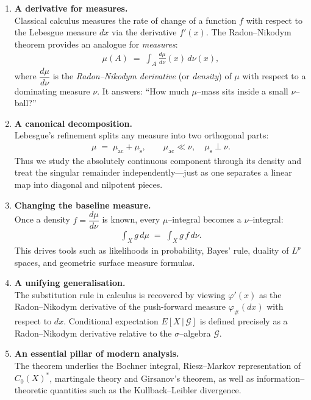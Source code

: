 \documentclass[12pt]{article}
\title{}
\author{Jerich Lee}
\date{\today}
\theoremstyle{definition} %
\theoremstyle{plain} %
\begin{document}
\maketitle
\begin{enumerate}
  \item \textbf{A derivative for measures.}\\
  Classical calculus measures the rate of change of a function $f$ with respect to the Lebesgue measure $dx$ via the derivative $f'(x)$.  
  The Radon–Nikodym theorem provides an analogue for \emph{measures}:
  \begin{align}
      \mu(A) \;=\; \int_A \frac{d\mu}{d\nu}(x)\,d\nu(x),
  \end{align}
  where $\dfrac{d\mu}{d\nu}$ is the \emph{Radon–Nikodym derivative} (or \emph{density}) of $\mu$ with respect to a dominating measure $\nu$.
  It answers: “How much $\mu$–mass sits inside a small $\nu$–ball?”

  \item \textbf{A canonical decomposition.}\\
  Lebesgue’s refinement splits any measure into two orthogonal parts:
  \begin{align}
      \mu \;=\; \mu_{\text{ac}} + \mu_{\text{s}},
      \qquad
      \mu_{\text{ac}}\ll\nu,
      \quad
      \mu_{\text{s}}\perp\nu.
  \end{align}
  Thus we study the absolutely continuous component through its density and treat the singular remainder independently—just as one separates a linear map into diagonal and nilpotent pieces.

  \item \textbf{Changing the baseline measure.}\\
  Once a density $f = \dfrac{d\mu}{d\nu}$ is known, every $\mu$–integral becomes a $\nu$–integral:
  \begin{align}
      \int_X g\,d\mu
      \;=\;
      \int_X g\,f\,d\nu.
  \end{align}
  This drives tools such as likelihoods in probability, Bayes’ rule, duality of $L^{p}$ spaces, and geometric surface measure formulas.

  \item \textbf{A unifying generalisation.}\\
  The substitution rule in calculus is recovered by viewing $\varphi'(x)$ as the Radon–Nikodym derivative of the push-forward measure $\varphi_{\#}(dx)$ with respect to $dx$.  
  Conditional expectation $E[X\,|\,\mathcal{G}]$ is defined precisely as a Radon–Nikodym derivative relative to the $\sigma$–algebra $\mathcal{G}$.

  \item \textbf{An essential pillar of modern analysis.}\\
  The theorem underlies the Bochner integral, Riesz–Markov representation of $C_0(X)^{*}$, martingale theory and Girsanov’s theorem, as well as information–theoretic quantities such as the Kullback–Leibler divergence.
\end{enumerate}
\end{document}
